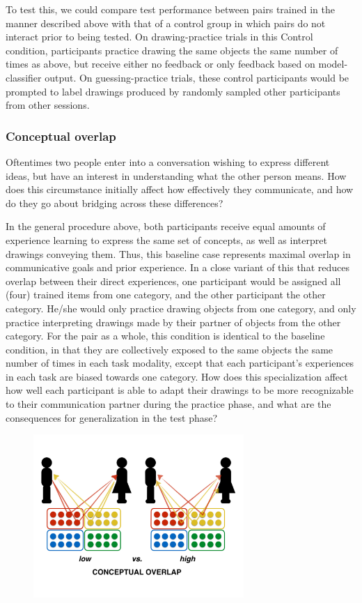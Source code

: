\documentclass[12pt]{article}
\begin{document}
To test this, we could compare test performance between pairs trained in the manner described above with that of a control group in which pairs do not interact prior to being tested. On drawing-practice trials in this Control condition, participants practice drawing the same objects the same number of times as above, but receive either no feedback or only feedback based on model-classifier output. On guessing-practice trials, these control participants would be prompted to label drawings produced by randomly sampled other participants from other sessions. 

\subsubsection{Conceptual overlap} Oftentimes two people enter into a conversation wishing to express different ideas, but have an interest in understanding what the other person means. How does this circumstance initially affect how effectively they communicate, and how do they go about bridging across these differences? 

In the general procedure above, both participants receive equal amounts of experience learning to express the same set of concepts, as well as interpret drawings conveying them. Thus, this baseline case represents maximal overlap in communicative goals and prior experience. In a close variant of this that reduces overlap between their direct experiences, one participant would be assigned all (four) trained items from one category, and the other participant the other category. He/she would only practice drawing objects from one category, and only practice interpreting drawings made by their partner of objects from the other category. For the pair as a whole, this condition is identical to the baseline condition, in that they are collectively exposed to the same objects the same number of times in each task modality, except that each participant's experiences in each task are biased towards one category. How does this specialization affect how well each participant is able to adapt their drawings to be more recognizable to their communication partner during the practice phase, and what are the consequences for generalization in the test phase?

\begin{figure}[hbtp]
\begin{center}
\includegraphics[width=80mm]{figures/conceptual_overlap.pdf}
\end{center}
\end{figure}
\vspace{-5mm}
\end{document}
